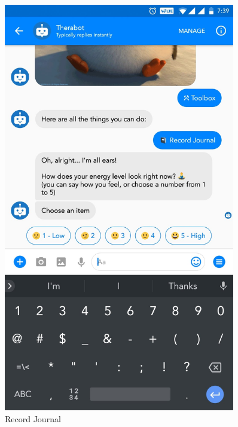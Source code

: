 \vspace*{\fill}
\begin{figure}[H]
    \centering
    \begin{minipage}{0.45\textwidth}
        \centering
        \includegraphics[width=0.9\textwidth]{images/screenshots/chatbot/3.jpg}
        \caption{Record Journal}
    \end{minipage}\hfill
    \begin{minipage}{0.45\textwidth}
        \centering

\end{minipage}
\end{figure}
